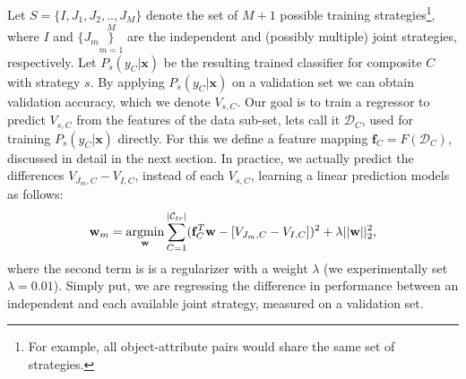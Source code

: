 \documentclass[runningheads]{llncs}
\begin{document}
Let $S = \{ I, J_1, J_2, .., J_M\}$ denote the set of $M+1$  possible training strategies\footnote{For example, all object-attribute pairs would share the same set of strategies.}, where $I$ and $\{J_{m}\}\limits_{m=1}^M$ are the independent and (possibly multiple) joint strategies, respectively. 
Let $P_s(y_C | \mathbf{x})$ be the resulting trained classifier for composite $C$ with strategy $s$.  
By applying $P_s(y_C | \mathbf{x})$ on a validation set we can obtain validation accuracy, which we denote $V_{s,C}$. Our goal is to train a regressor to predict $V_{s,C}$ from the features of the data sub-set, lets call it $\mathcal{D}_C$, used for training $P_s(y_C | \mathbf{x})$ directly. For this we define a feature mapping $\mathbf{f}_C = F(\mathcal{D}_C)$, discussed in detail in the next section. 
In practice, we actually predict the differences $V_{J_m,C} - V_{I,C}$, instead of each $V_{s,C}$, learning a linear prediction models as follows:
%
\vspace{-0.3cm}
\begin{align}\label{first}
\mathbf{w}_m = \operatornamewithlimits{argmin}_{\mathbf{w}}\sum\limits_{C=1}^{|\mathcal{C}_{tr}|} (\mathbf{f}_{C}^{T} \mathbf{w} - [V_{J_m,C} - V_{I,C}])^2 + \lambda|| \mathbf{w}||_2^2,
\end{align}
%
where the second term is is a regularizer with a weight $\lambda$ (we experimentally set $\lambda = 0.01$). Simply put, we are regressing the difference in performance between an independent and each available joint strategy, measured on a validation set. 
\end{document}
